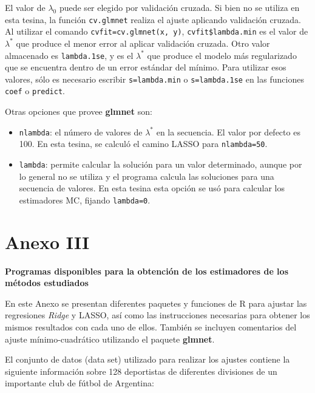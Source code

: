 \documentclass[a4paper,12pt]{report}
\begin{document}
El valor de $\lambda_0$ puede ser elegido por validación cruzada. Si bien no se utiliza en esta tesina, la función \texttt{cv.glmnet} realiza el ajuste aplicando validación cruzada. Al utilizar el comando \texttt{cvfit=cv.glmnet(x, y)}, \texttt{cvfit\$lambda.min} es el valor de $\lambda^*$ que produce el menor error al aplicar validación cruzada. Otro valor almacenado es \texttt{lambda.1se}, y es el $\lambda^*$ que produce el modelo más regularizado que se encuentra dentro de un error estándar del mínimo. Para utilizar esos valores, sólo es necesario escribir \texttt{s=lambda.min} o \texttt{s=lambda.1se} en las funciones \texttt{coef} o \texttt{predict}. 

\newpage

Otras opciones que provee \textbf{glmnet} son:

\begin{itemize}
\item \texttt{nlambda}: el número de valores de $\lambda^*$ en la secuencia. El valor por defecto es 100. En esta tesina, se calculó el camino LASSO para \texttt{nlambda=50}.

\item \texttt{lambda}: permite calcular la solución para un valor determinado, aunque por lo general no se utiliza y el programa calcula las soluciones para una secuencia de valores. En esta tesina esta opción se usó para calcular los estimadores MC, fijando \texttt{lambda=0}.
\end{itemize}

\chapter*{Anexo III}
{\textbf{\Large{Programas disponibles para la obtención de los estimadores de los métodos estudiados}}}

\newpage

En este Anexo se presentan diferentes paquetes y funciones de R para ajustar las regresiones \textit{Ridge} y LASSO, así como las instrucciones necesarias para obtener los mismos resultados con cada uno de ellos. También se incluyen comentarios del ajuste mínimo-cuadrático utilizando el paquete \textbf{glmnet}. 

El conjunto de datos (data set) utilizado para realizar los ajustes contiene la siguiente información sobre 128 deportistas de diferentes divisiones de un importante club de fútbol de Argentina:   
\end{document}
